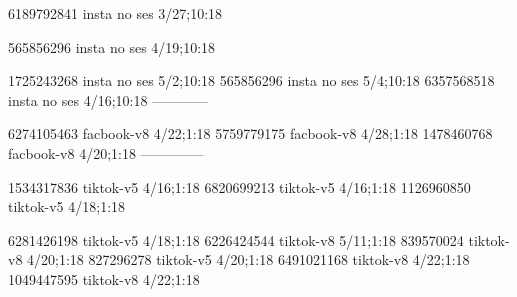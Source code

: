 
6189792841 insta no ses
3/27;10:18

565856296 insta no ses
4/19;10:18

1725243268 insta no ses
5/2;10:18
565856296 insta no ses
5/4;10:18
6357568518 insta no ses
4/16;10:18
------------

6274105463 facbook-v8
4/22;1:18
5759779175 facbook-v8
4/28;1:18
1478460768 facbook-v8
4/20;1:18
--------------

1534317836 tiktok-v5
4/16;1:18
6820699213 tiktok-v5
4/16;1:18
1126960850 tiktok-v5
4/18;1:18

6281426198 tiktok-v5
4/18;1:18
6226424544 tiktok-v8
5/11;1:18
839570024 tiktok-v8
4/20;1:18
827296278 tiktok-v5
4/20;1:18
6491021168 tiktok-v8
4/22;1:18
1049447595 tiktok-v8
4/22;1:18
